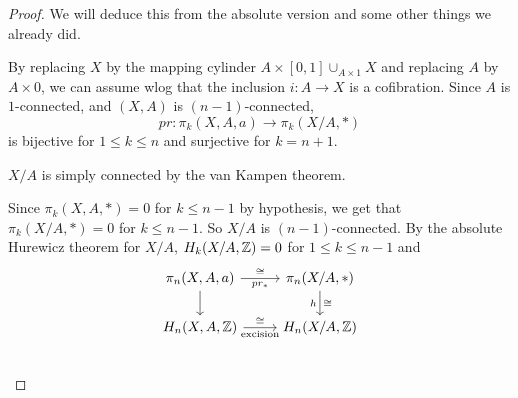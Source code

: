 \documentclass[language=english]{TemplateLecture}
\begin{document}
\begin{proof}
    We will deduce this from the absolute version and some other things we already did.

    By replacing \(X\) by the mapping cylinder \(A\times [0,1]\cup_{A\times 1} X\) and replacing \(A\) by \(A\times 0\), we can assume wlog that the inclusion \(i\colon A \to X\) is a cofibration. Since \(A\) is \(1\)-connected, and \((X,A)\) is \((n-1)\)-connected,
    \[pr\colon \pi_k(X,A,a) \to \pi_k(X/A, *)\]
    is bijective for \(1\leq k\leq n\) and surjective for \(k = n+1\).

    \(X/A\) is simply connected by the van Kampen theorem.

    Since \(\pi_k(X,A,*) = 0\) for \(k\leq n-1\) by hypothesis, we get that \(\pi_k(X/A, *) = 0\) for \(k\leq n-1\). So \(X/A\) is \((n-1)\)-connected. By the absolute Hurewicz theorem for \(X/A\), \(H_k(X/A, \mathbb{Z}) = 0\) for \(1 \leq k\leq n-1\) and
    \[\begin{tikzcd}
        \pi_n(X,A,a) \ar[r, "\cong", "pr_*"'] \ar[d] & \pi_n(X/A, *) \ar[d, "\cong", "h"']\\
        H_n(X,A,\iz) \ar[r, "\cong", "\text{excision}"'] & H_n(X/A, \iz) \\
    \end{tikzcd}\]
\end{proof}
\end{document}

